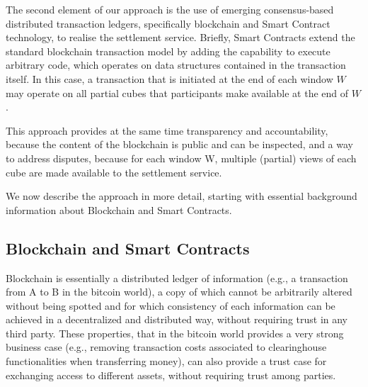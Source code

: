 \documentclass[conference]{IEEEtran}
\begin{document}
The second element of our approach is the use of emerging consensus-based distributed transaction ledgers, specifically blockchain and Smart Contract technology, to realise the settlement service.
Briefly, Smart Contracts extend the standard blockchain transaction model by adding the capability to execute arbitrary code, which operates on data structures contained in the transaction itself. 
In this case, a transaction that is initiated at the end of each window $W$ may operate on all partial cubes that participants make available at the end of $W$.

This  approach provides at the same time transparency and accountability, because the content of the blockchain is public and can be inspected, and a way to address disputes, because for each window W, multiple (partial) views of each cube are made available to the settlement service.

%
We now describe the approach in more detail, starting with essential background information about Blockchain and Smart Contracts.

\subsection{Blockchain and Smart Contracts}


Blockchain is essentially a distributed ledger of information (e.g., a transaction from A to B in the bitcoin world), a copy of which cannot be arbitrarily altered without being spotted and for which consistency of each information can be achieved in a decentralized and distributed way, without requiring trust in any third party. These properties, that in the bitcoin world provides a very strong business case (e.g., removing transaction costs associated to clearinghouse functionalities when transferring money), can also provide a trust case for exchanging access to different assets, without requiring trust among parties.
\end{document}
